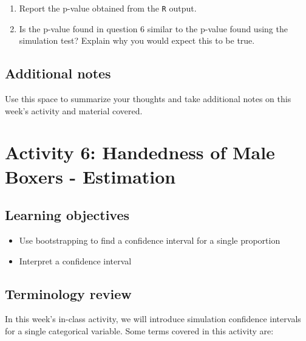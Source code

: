 \documentclass[
]{report}
\begin{document}
\begin{enumerate}
\def\labelenumi{\arabic{enumi}.}
\setcounter{enumi}{5}
\item
  Report the p-value obtained from the \texttt{R} output.
  \vspace{0.2in}
\item
  Is the p-value found in question 6 similar to the p-value found using the simulation test? Explain why you would expect this to be true.
\end{enumerate}

\vspace{0.5in}

\hypertarget{additional-notes}{%
\section{Additional notes}\label{additional-notes}}

Use this space to summarize your thoughts and take additional notes on this week's activity and material covered.

\hypertarget{activity-6-handedness-of-male-boxers---estimation}{%
\chapter{Activity 6: Handedness of Male Boxers - Estimation}\label{activity-6-handedness-of-male-boxers---estimation}}

\hypertarget{learning-objectives}{%
\section{Learning objectives}\label{learning-objectives}}

\begin{itemize}
\item
  Use bootstrapping to find a confidence interval for a single proportion
\item
  Interpret a confidence interval
\end{itemize}

\hypertarget{terminology-review}{%
\section{Terminology review}\label{terminology-review}}

In this week's in-class activity, we will introduce simulation confidence intervals for a single categorical variable. Some terms covered in this activity are:
\end{document}
